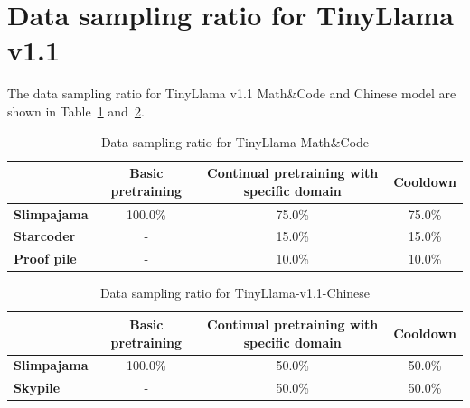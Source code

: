 \documentclass{article}
\begin{document}
\section{Data sampling ratio for TinyLlama v1.1}\label{appendix:data_sampling}
The data sampling ratio for TinyLlama v1.1 Math\&Code and Chinese model are shown in Table~\ref{tab:math_code_sampling} and~\ref{tab:chinese_sampling}.
\begin{table}[htbp]
  \centering
  \small
  \caption{
    Data sampling ratio for TinyLlama-Math\&Code
  }
  \begin{tabular}{lccc}
    \toprule
     & \textbf{Basic pretraining}	& \textbf{Continual pretraining with specific domain}	& \textbf{Cooldown}	\\
    \midrule
    \textbf{Slimpajama} \xspace    & 100.0\%  &  75.0\%	& 75.0\% \\
    \textbf{Starcoder}\xspace    & -  &   	15.0\%	& 	15.0\% \\
    \textbf{Proof pile}\xspace    & -     &  	10.0\%	& 	10.0\% \\
    \bottomrule
  \end{tabular}
  \label{tab:math_code_sampling}
\end{table}
\begin{table}[htbp]
  \centering
  \small
  \caption{
    Data sampling ratio for TinyLlama-v1.1-Chinese
  }
  \begin{tabular}{lccc}
    \toprule
     & \textbf{Basic pretraining}	& \textbf{Continual pretraining with specific domain}	& \textbf{Cooldown}	\\
    \midrule
    \textbf{Slimpajama} \xspace    & 100.0\%  &  50.0\%	& 50.0\% \\
    \textbf{Skypile}\xspace    & -  &   		50.0\%	& 		50.0\% \\
    \bottomrule
  \end{tabular}
  \label{tab:chinese_sampling}
\end{table}
\end{document}
